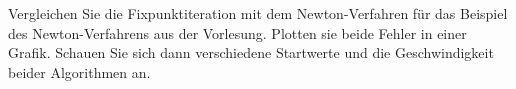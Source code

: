 \begin{aufg}[0]
Vergleichen Sie die Fixpunktiteration mit dem Newton-Verfahren f\"ur das Beispiel des Newton-Verfahrens aus der Vorlesung. Plotten sie beide Fehler in einer Grafik. Schauen 
Sie sich dann verschiedene Startwerte und die Geschwindigkeit beider Algorithmen an.
\end{aufg}
